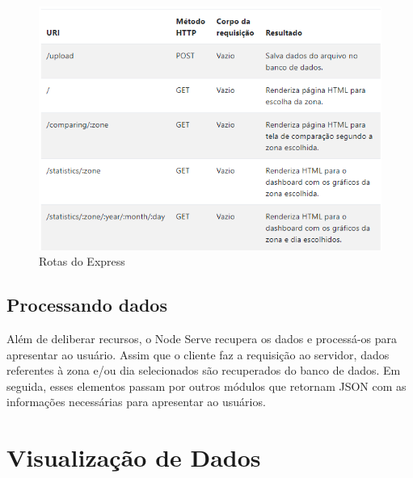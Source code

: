 \begin{figure}[!h]
  \caption{\label{rotas}Rotas do Express}
  \begin{center}
    \includegraphics[width=1.0\textwidth]{img/rotas.png}
  \end{center}
\end{figure}

\subsection{Processando dados}
Além de deliberar recursos, o Node Serve recupera os dados e processá-os para
apresentar ao usuário. Assim que o cliente faz a requisição ao servidor, dados
referentes à zona e/ou dia selecionados são recuperados do banco de dados. Em
seguida, esses elementos passam por outros módulos que retornam JSON com as
informações necessárias para apresentar ao usuários.

\section{Visualização de Dados}
\label{data-view}
